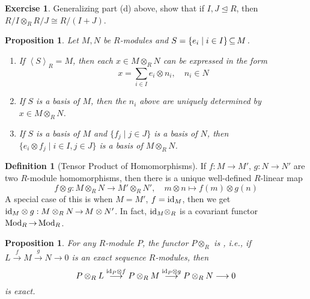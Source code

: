 \documentclass[11pt]{book}
\newcounter{counter}
\newtheorem{proposition}[counter]{Proposition}   \newtheorem{problem}[counter]{Problem}   \newtheorem*{proposition*}{Proposition}   \newtheorem*{lemma*}{Lemma}
\theoremstyle{definition}   \newtheorem{defn}[counter]{Definition} %
\newtheorem*{exercise*}{Exercise}
\newcommand{\nsg}{\mathrel{\unlhd}}   \newcommand{\ind}{\parindent24pt}   \newcommand{\vn}{\varnothing}    \newcommand{\lar}{\longrightarrow}
\newcommand{\gen}[1]{\left\langle #1 \right\rangle}   \newcommand{\stab}[2]{\tn{Stab}_{#1}(#2)}   \newcommand{\fix}[2]{\tn{Fix}_{#1}(#2)}   \newcommand{\op}{^{\tn{op}}}
\DeclareMathOperator{\ra}{\rightarrow}   \DeclareMathOperator{\Poly}{\mathbf{P}}   \DeclareMathOperator{\spn}{\textnormal{span}}   \DeclareMathOperator{\aut}{\textnormal{Aut}}
\newcommand{\vs}{\vspace{8pt}}
\numberwithin{counter}{chapter}
\begin{document}
\begin{exercise*}
Generalizing part (d) above, show that if $I,J \nsg R$, then $R/I \otimes_R R/J \cong R/(I+J)$. 
\end{exercise*}

\vs

\begin{proposition}
Let $M,N$ be $R$-modules and $S = \{e_i \mid i \in I\} \operatorname{\subseteq} M$.
\begin{enumerate}
\item[(a)] If $\gen{S}_R = M$, then each $x \in M \otimes_R N$ can be expressed in the form
	\[x = \sum_{i \in I} e_i \otimes n_i, \quad n_i \in N \]
\item[(b)] If $S$ is a basis of $M$, then the $n_i$ above are uniquely determined by $x \in M \otimes_R N$. 
\item[(c)] If $S$ is a basis of $M$ and $\{f_j \mid j \in J\}$ is a basis of $N$, then $\{e_i \otimes f_j \mid i \in I, j \in J\}$ is a basis of $M \otimes_R N$. 
\end{enumerate}
\end{proposition}

\vs

\begin{defn}[Tensor Product of Homomorphisms]
If $f : M \ra M'$, $g : N \ra N'$ are two $R$-module homomorphisms, then there is a unique well-defined $R$-linear map 
	\[f \otimes g : M \otimes_R N \ra M' \otimes_R N', \quad m \otimes n \mapsto f(m) \otimes g(n) \]
A special case of this is when $M = M'$, $f = \textnormal{id}_M$, then we get $\id_M \otimes g : M \otimes_R N \ra M\otimes N'$. In fact, $\textnormal{id}_M \otimes_R$ is a covariant functor $\tn{Mod}_R \ra \tn{Mod}_R$. 
\end{defn}

\vs

\begin{proposition}
For any $R$-module $P$, the functor $P \otimes_R$ is , i.e., if $L \overset{f}{\lar} M \overset{g}{\lar} N \lar 0$ is an exact sequence $R$-modules, then 
	\[P \otimes_R L \overset{\id_P \otimes f}{\lar} P \otimes_R M \overset{\id_P \otimes g}{\lar} P \otimes_R N \lar 0 \]
is exact. 
\end{proposition}
\end{document}
